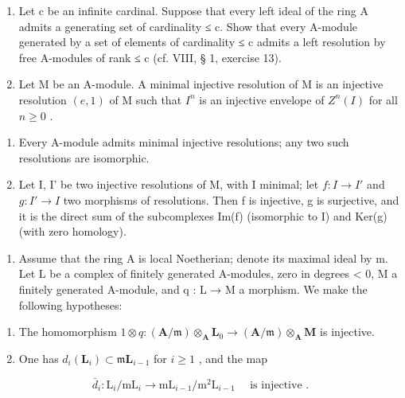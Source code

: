 \begin{enumerate}
\def\labelenumi{\arabic{enumi})}
\setcounter{enumi}{11}
\item
  Let c be an infinite cardinal. Suppose that every left ideal of the ring A admits a generating set of cardinality ≤ c. Show that every A-module generated by a set of elements of cardinality ≤ c admits a left resolution by free A-modules of rank ≤ c (cf. VIII, § 1, exercise 13).
\item
  Let M be an A-module. A minimal injective resolution of M is an injective resolution \((e, 1)\) of M such that \(I^n\) is an injective envelope of \(Z^n(I)\) for all \(n \geqslant 0\) .
\end{enumerate}

\begin{enumerate}
\def\labelenumi{\alph{enumi})}
\tightlist
\item
  Every A-module admits minimal injective resolutions; any two such resolutions are isomorphic.
\item
  Let I, I' be two injective resolutions of M, with I minimal; let \(f: I \to I'\) and \(g: I' \to I\) two morphisms of resolutions. Then f is injective, g is surjective, and it is the direct sum of the subcomplexes Im(f) (isomorphic to I) and Ker(g) (with zero homology).
\end{enumerate}

\begin{enumerate}
\def\labelenumi{\arabic{enumi})}
\setcounter{enumi}{13}
\tightlist
\item
  Assume that the ring A is local Noetherian; denote its maximal ideal by m. Let L be a complex of finitely generated A-modules, zero in degrees \textless{} 0, M a finitely generated A-module, and q : L → M a morphism. We make the following hypotheses:
\end{enumerate}

\begin{enumerate}
\def\labelenumi{(\roman{enumi})}
\item
  The homomorphism \(1 \otimes q : (\mathbf{A}/\mathfrak{m}) \otimes_{\mathbf{A}} \mathbf{L}_{0} \to (\mathbf{A}/\mathfrak{m}) \otimes_{\mathbf{A}} \mathbf{M}\) is injective.
\item
  One has \(d_{i}(\mathbf{L}_{i})\subset \mathfrak{m}\mathbf{L}_{i - 1}\) for \(i\geqslant 1\) , and the map
\end{enumerate}

\[
\bar {d} _ {i}: \mathrm{L} _ {i} / \mathrm{mL} _ {i} \rightarrow \mathrm{mL} _ {i - 1} / \mathrm{m} ^ {2} \mathrm{L} _ {i - 1} \quad \text { is injective }.
\]

